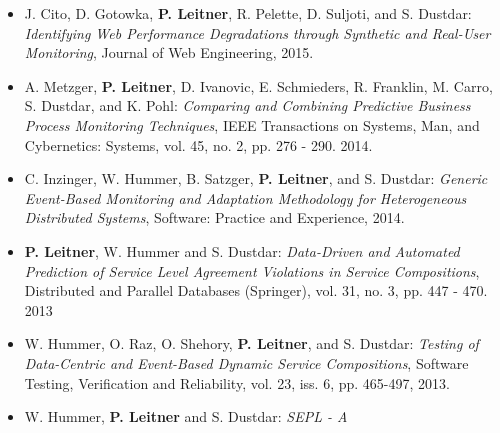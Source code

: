 \documentclass[paper=letter,fontsize=11pt]{scrartcl} %
\begin{document}
\begin{itemize}
  \item J. Cito, D. Gotowka, \textbf{P. Leitner}, R. Pelette, D. Suljoti, and S. Dustdar: \emph{Identifying Web Performance Degradations through Synthetic and Real-User Monitoring}, Journal of Web Engineering, 2015.
  \item  A. Metzger, \textbf{P. Leitner}, D. Ivanovic, E. Schmieders, R. Franklin, M. Carro, S. Dustdar, and K. Pohl: \emph{Comparing and Combining Predictive Business Process Monitoring Techniques}, IEEE Transactions on Systems, Man, and Cybernetics: Systems, vol. 45, no. 2, pp. 276 - 290. 2014.
  \item C. Inzinger, W. Hummer, B. Satzger, \textbf{P. Leitner}, and S. Dustdar: \emph{Generic Event-Based Monitoring and Adaptation Methodology for Heterogeneous Distributed Systems}, Software: Practice and Experience, 2014.
  \item \textbf{P. Leitner}, W. Hummer and S. Dustdar: \emph{Data-Driven and Automated Prediction of Service Level Agreement Violations in Service Compositions}, Distributed and Parallel Databases (Springer), vol. 31, no. 3, pp. 447 - 470. 2013
  \item W. Hummer, O. Raz, O. Shehory, \textbf{P. Leitner}, and S. Dustdar: \emph{Testing of Data-Centric and Event-Based Dynamic Service Compositions}, Software Testing, Verification and Reliability, vol. 23, iss. 6, pp. 465-497, 2013.
\item W. Hummer, \textbf{P. Leitner} and S. Dustdar: \emph{SEPL - A
}
\end{itemize}
\end{document}
